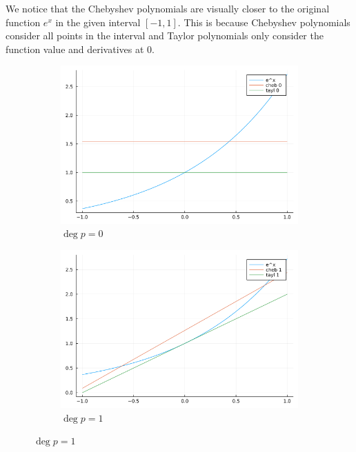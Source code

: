 \documentclass{article}
\newcommand{\1}{\bm 1}
\begin{document}
We notice that the Chebyshev polynomials are visually closer to the original function $e^x$ in the given interval $[-1, 1]$. This is because Chebyshev polynomials consider all points in the interval and Taylor polynomials only consider the function value and derivatives at 0.

\begin{figure}[!ht]
    \centering
    \begin{subfigure}[b]{0.48\textwidth}
        \centering
        \includegraphics[width=\textwidth]{compare-0.png}
        \caption{$\deg p=0$}
    \end{subfigure}
    \hfill
    \begin{subfigure}[b]{0.48\textwidth}
        \centering
        \includegraphics[width=\textwidth]{compare-1.png}
        \caption{$\deg p=1$}
    \end{subfigure}
    \newline

\end{figure}
\end{document}
